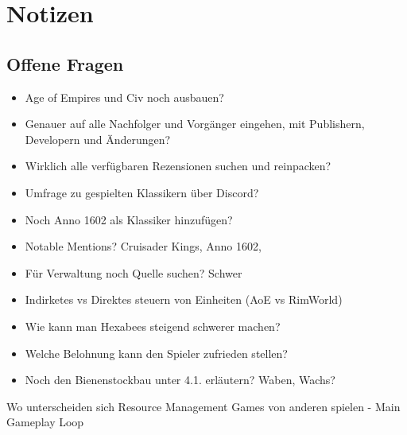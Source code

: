 \section*{Notizen}
\subsection*{Offene Fragen}
\begin{itemize}
    \item Age of Empires und Civ noch ausbauen?
    \item Genauer auf alle Nachfolger und Vorgänger eingehen, mit Publishern, Developern und Änderungen?
    \item Wirklich alle verfügbaren Rezensionen suchen und reinpacken?
    \item Umfrage zu gespielten Klassikern über Discord?
    \item Noch Anno 1602 als Klassiker hinzufügen?
    \item Notable Mentions? Cruisader Kings, Anno 1602, 
    \item Für Verwaltung noch Quelle suchen? Schwer
    \item Indirketes vs Direktes steuern von Einheiten (AoE vs RimWorld)
    \item Wie kann man Hexabees steigend schwerer machen?
    \item Welche Belohnung kann den Spieler zufrieden stellen?
    \item Noch den Bienenstockbau unter 4.1. erläutern? Waben, Wachs?
\end{itemize}

Wo unterscheiden sich Resource Management Games von anderen spielen
- Main Gameplay Loop 

